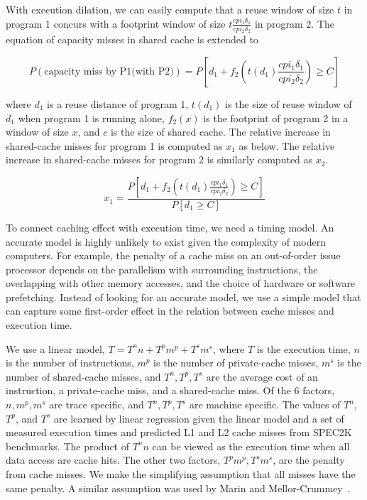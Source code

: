 With execution dilation, we can easily compute that a reuse window
of size $t$ in program 1 concurs with a footprint window of size
$t\frac{cpi_1\delta_1}{cpi_2\delta_2}$ in program 2. The equation of
capacity misses in shared cache is extended to

\begin{equation}
\label{eq:x}
P(\mbox{capacity miss by P1(with P2)}) = P\left[d_1 + f_2\left(t(d_1)\frac{cpi_1\delta_1}{cpi_2\delta_2}\right) \ge C\right]
\end{equation}

\noindent where $d_1$ is a reuse distance of program 1, $t(d_1)$ is the
size of reuse window of $d_1$ when program 1 is running alone, $f_2(x)$ is
the footprint of program 2 in a window of size $x$, and $c$ is the
size of shared cache. The relative increase in shared-cache misses
for program 1 is computed as $x_1$ as below. The relative increase in
shared-cache misses for program 2 is similarly computed as $x_2$.

\begin{equation}
\label{eq:x}
x_1 = \frac{P\left[d_1 + f_2\left(t(d_1)\frac{cpi_1\delta_1}{cpi_2\delta_2}\right) \ge C\right]}{P\left[d_1 \ge C\right]}
\end{equation}

To connect caching effect with execution time, we need a timing model.
An accurate model is highly unlikely to exist given the complexity of
modern computers.  For example, the penalty of a cache miss on an
out-of-order issue processor depends on the parallelism with
surrounding instructions, the overlapping with other memory accesses,
and the choice of hardware or software prefetching.  Instead of
looking for an accurate model, we use a simple model that can capture
some first-order effect in the relation between cache misses and
execution time.  

We use a linear model, $T = T^n n + T^p m^p + T^s m^s$, where $T$ is
the execution time, $n$ is the number of instructions, $m^p$ is the number
of private-cache misses, $m^s$ is the number of shared-cache misses,
and $T^n, T^p, T^s$ are the average cost of an instruction, a
private-cache miss, and a shared-cache miss.  Of the 6 factors, $n,
m^p, m^s$ are trace specific, and $T^n, T^p, T^s$ are machine
specific.  The values of $T^n$, $T^p$, and $T^s$ are learned by 
linear regression given the linear model and a set of measured
execution times  and predicted L1 and L2 cache misses from SPEC2K
benchmarks. The product of $T^n n$ can be viewed as the execution time
when all data access are cache hits.  The other two factors, $T^p m^p,
T^s m^s$, are the penalty from cache misses.  We make the simplifying
assumption that all misses have the same penalty.  A similar
assumption was used by Marin and
Mellor-Crummey~\cite{MarinM:SIGMETRICS04}. 


